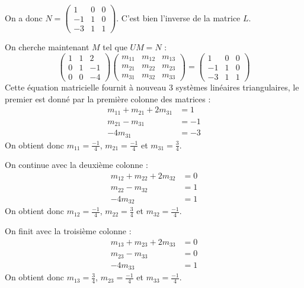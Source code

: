 \begin{enumerate}
{\begin{solution}
            On a donc $N = \begin{pmatrix} 1 & 0 & 0 \\ -1 & 1 & 0 \\ -3 & 1 & 1 \end{pmatrix}$. C'est bien l'inverse de la matrice $L$. 

            On cherche maintenant $M$ tel que $U M = N$ : 
            \[
                \begin{pmatrix}
                    1 & 1 & 2 \\
                    0 & 1 & -1 \\
                    0 & 0 & -4
                \end{pmatrix}
                \begin{pmatrix}
                    m_{11} & m_{12} & m_{13} \\
                    m_{21} & m_{22} & m_{23} \\
                    m_{31} & m_{32} & m_{33}
                \end{pmatrix}
                = \begin{pmatrix} 1 & 0 & 0 \\ -1 & 1 & 0 \\ -3 & 1 & 1 \end{pmatrix}
            \]
            Cette équation matricielle fournit à nouveau 3 systèmes linéaires triangulaires, le premier est donné par la première colonne des matrices : 
            \begin{align*}
                m_{11} + m_{21} + 2m_{31} &= 1 \\
                m_{21} - m_{31} &= -1 \\
                -4 m_{31} &= -3
            \end{align*}
            On obtient donc $m_{11} = \frac{-1}{4}$, $m_{21} = \frac{-1}{4}$ et $m_{31} = \frac{3}{4}$.

            On continue avec la deuxième colonne :
            \begin{align*}
                m_{12} + m_{22} + 2m_{32} &= 0 \\
                m_{22} - m_{32} &= 1 \\
                -4 m_{32} &= 1
            \end{align*}
            On obtient donc $m_{12} = \frac{-1}{4}$, $m_{22} = \frac{3}{4}$ et $m_{32} = \frac{-1}{4}$.

            On finit avec la troisième colonne :
            \begin{align*}
                m_{13} + m_{23} + 2m_{33} &= 0 \\
                m_{23} - m_{33} &= 0 \\
                -4 m_{33} &= 1
            \end{align*}
            On obtient donc $m_{13} = \frac{3}{4}$, $m_{23} = \frac{-1}{4}$ et $m_{33} = \frac{-1}{4}$.


\end{solution}}
\end{enumerate}
